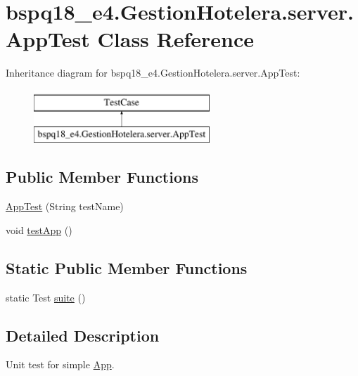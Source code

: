 \hypertarget{classbspq18__e4_1_1_gestion_hotelera_1_1server_1_1_app_test}{}\section{bspq18\+\_\+e4.\+Gestion\+Hotelera.\+server.\+App\+Test Class Reference}
\label{classbspq18__e4_1_1_gestion_hotelera_1_1server_1_1_app_test}
Inheritance diagram for bspq18\+\_\+e4.\+Gestion\+Hotelera.\+server.\+App\+Test\+:\begin{figure}[H]
\begin{center}
\leavevmode
\includegraphics[height=2.000000cm]{classbspq18__e4_1_1_gestion_hotelera_1_1server_1_1_app_test}
\end{center}
\end{figure}
\subsection*{Public Member Functions}
\begin{DoxyCompactItemize}
\item 
\mbox{\hyperlink{classbspq18__e4_1_1_gestion_hotelera_1_1server_1_1_app_test_aa533fc0fe7c5b885f29f4e1ddc988c93}{App\+Test}} (String test\+Name)
\item 
void \mbox{\hyperlink{classbspq18__e4_1_1_gestion_hotelera_1_1server_1_1_app_test_a46033a544062fc8342a03b218f8b2326}{test\+App}} ()
\end{DoxyCompactItemize}
\subsection*{Static Public Member Functions}
\begin{DoxyCompactItemize}
\item 
static Test \mbox{\hyperlink{classbspq18__e4_1_1_gestion_hotelera_1_1server_1_1_app_test_adc3bf1d336b34341b45745cea798fe12}{suite}} ()
\end{DoxyCompactItemize}


\subsection{Detailed Description}
Unit test for simple \mbox{\hyperlink{classbspq18__e4_1_1_gestion_hotelera_1_1_app}{App}}. 


